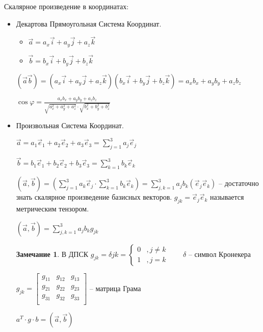 \documentclass{book}
\theoremstyle{definition}
\newtheorem*{note}{Замечание}
\begin{document}
Скалярное произведение в координатах:
\begin{itemize}
    \item Декартова Прямоугольная Система Координат.
        \begin{itemize}
            \item [] $\vec a = a_x\vec i + a_y\vec j + a_z\vec k$
            \item [] $\vec b = b_x\vec i + b_y\vec j + b_z\vec k$
        \end{itemize}
        $(\vec a \vec b) = (a_x\vec i + a_y\vec j + a_z\vec k)(b_x\vec i + b_y\vec j + b_z\vec k) = a_xb_x + a_yb_y + a_zb_z$

         $\cos \varphi = \frac{a_xb_x + a_yb_y + a_zb_z}{\sqrt{a_x^2 + a_y^2 + a_z^2}\cdot \sqrt{b_x^2 + b_y^2 + b_z^2}  }$
     \item Произвольная Система Координат. 
         
         $\vec a = a_1\vec e_1 + a_2\vec e_2 + a_3\vec e_3 = \sum_{j=1}^{3} a_j\vec e_j$
         
         $\vec b = b_1\vec e_1 + b_2\vec e_2 + b_3\vec e_3 = \sum_{k=1}^{3} b_k\vec e_k$

         $(\vec a, \vec b) = \left( \sum_{j=1}^{3} a_k\vec e_j \cdot \sum_{k=1}^{3} b_k\vec e_k \right)  = \sum_{j, k=1}^{3} a_jb_k(\vec e_j \vec e_k)$ -- достаточно знать скалярное произведение базисных векторов. $g_{jk} = \vec e_j\vec e_k$ называется метрическим тензором.

         $(\vec a, \vec b) = \sum_{j, k=1}^{3} a_jb_kg_{jk}$

         \begin{note}
             В ДПСК $g_{jk} = \delta{jk} = \begin{cases}
                 0 &, j\neq k\\
                 1 &, j=k
             \end{cases}\qquad \delta $ -- символ Кронекера
         \end{note}

         $g_{jk} = \begin{bmatrix} g_{11} & g_{12} & g_{13}\\ g_{21} & g_{22} & g_{23} \\ g_{31} & g_{32} & g_{33}\\ \end{bmatrix} $ -- матрица Грама

         $a^T\cdot g\cdot b = (\vec a, \vec b)$
\end{itemize}
\end{document}
